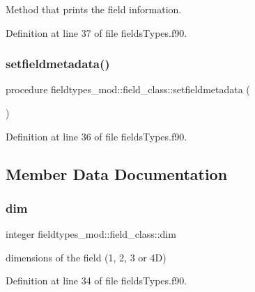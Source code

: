 Method that prints the field information. 



Definition at line 37 of file fields\+Types.\+f90.

\mbox{\label{structfieldtypes__mod_1_1field__class_a3dd056d55794122c3358d103e2c56f18}} 
\subsubsection{\texorpdfstring{setfieldmetadata()}{setfieldmetadata()}}
{\footnotesize\ttfamily procedure fieldtypes\+\_\+mod\+::field\+\_\+class\+::setfieldmetadata (\begin{DoxyParamCaption}{ }\end{DoxyParamCaption})\hspace{0.3cm}{\ttfamily [private]}}



Definition at line 36 of file fields\+Types.\+f90.



\subsection{Member Data Documentation}
\mbox{\label{structfieldtypes__mod_1_1field__class_a46ac561c9acc61595c7e15d30a56794e}} 
\subsubsection{\texorpdfstring{dim}{dim}}
{\footnotesize\ttfamily integer fieldtypes\+\_\+mod\+::field\+\_\+class\+::dim\hspace{0.3cm}{\ttfamily [private]}}



dimensions of the field (1, 2, 3 or 4D) 



Definition at line 34 of file fields\+Types.\+f90.


